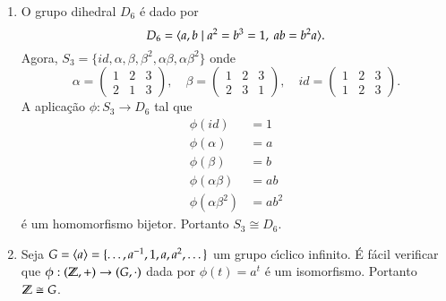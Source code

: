 \begin{exemplos}
	\begin{enumerate}[label=({\arabic*})]
		\item O grupo dihedral $D_6$ \'e dado por
		\[
			D_6 = \langle{a,b \mid a^2 = b^3 = 1,\ ab = b^2a}\rangle.
		\]
		Agora, $S_3 = \{id,\alpha,\beta,\beta^2,\alpha\beta,\alpha\beta^2\}$ onde
		\[
			\alpha = \begin{pmatrix}
				1 & 2 & 3\\
				2 & 1 & 3
			\end{pmatrix},\quad
			\beta = \begin{pmatrix}
				1 & 2 & 3\\
				2 & 3 & 1
			\end{pmatrix},\quad
			id = \begin{pmatrix}
				1 & 2 & 3\\
				1 & 2 & 3
			\end{pmatrix}.
		\]
		A aplica\c{c}\~ao $\phi : S_3 \to D_6$ tal que
		\begin{align*}
			\phi(id) &= 1\\
			\phi(\alpha) &= a\\
			\phi(\beta) &= b\\
			\phi(\alpha\beta) &= ab\\
			\phi(\alpha\beta^2) &= ab^2
		\end{align*}
		\'e um homomorfismo bijetor. Portanto $S_3 \cong D_6$.

		\item Seja $G = \langle{a}\rangle = \{\dots, a^{-1}, 1, a, a^2, \dots\}$ um grupo c{\'\i}clico infinito. \'E f\'acil verificar que $\phi: (\mathbb{Z}, +) \to (G, \cdot)$ dada por $\phi(t) = a^t$ \'e um isomorfismo. Portanto $\mathbb{Z} \cong G$.
	\end{enumerate}
\end{exemplos}

